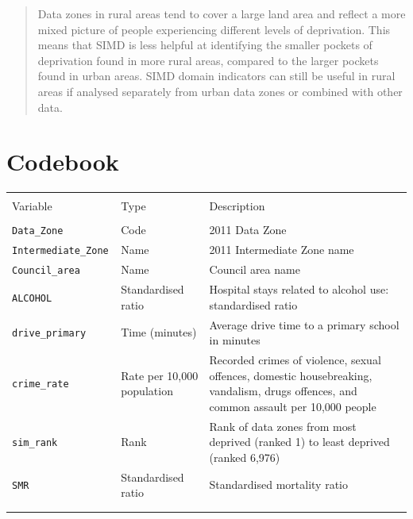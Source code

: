 \documentclass[12pt,a4paper]{article}
\makeatletter
\renewenvironment{table}[1][]{%
 \ifthenelse{\equal{#1}{}}{%
   \@float{table}
 }{%
   \@float{table}[#1]%
 }%
 \centering
}{%
 \end@float
}
\makeatother
\begin{document}
\begin{quote}
Data zones in rural areas tend to cover a large land area and reflect a
more mixed picture of people experiencing different levels of
deprivation. This means that SIMD is less helpful at identifying the
smaller pockets of deprivation found in more rural areas, compared to
the larger pockets found in urban areas. SIMD domain indicators can
still be useful in rural areas if analysed separately from urban data
zones or combined with other data.
\end{quote}

\vspace{0.5cm}

\section{Codebook}\label{codebook}

\begin{table}[!h]
\centering
\fontsize{8.5}{8.5}\selectfont
\begin{tabularx}{\textwidth}{llX}
  \toprule
    &   \\[-1.9ex]\hline
            &  \\[-1.2ex]
        Variable    &   Type & Description\\ \hline
        &  \\[-1.1ex]
\texttt{Data\_Zone} &   Code    &   2011 Data Zone  \\\addlinespace[0.7ex]
\texttt{Intermediate\_Zone  }   &   Name    &   2011 Intermediate Zone name \\\addlinespace[0.7ex]
\texttt{Council\_area}  &   Name    &   Council area name   \\\addlinespace[0.7ex]
\texttt{ALCOHOL}    &   Standardised ratio  &   Hospital stays related to alcohol use: standardised ratio   \\\addlinespace[0.7ex]
\texttt{drive\_primary} &   Time (minutes)  &   Average drive time to a primary school in minutes   \\\addlinespace[0.7ex]
\texttt{crime\_rate}    &   Rate per 10,000 population  &   Recorded crimes of violence, sexual offences, domestic housebreaking, vandalism, drugs offences, and common assault per 10,000 people   \\\addlinespace[0.7ex]
\texttt{sim\_rank}  &   Rank & Rank of data zones from most deprived (ranked 1) to least deprived (ranked 6,976) \\\addlinespace[0.7ex]
\texttt{SMR}    &   Standardised ratio  &   Standardised mortality ratio    \\\hline
        & \\[-2.2ex]
        \bottomrule & \\[-1.8ex] 
    \end{tabularx}
    \caption{Codebook for \texttt{simd\_exam} Data Set}
    \label{tbl:codebook_simd}
\end{table}
\end{document}
